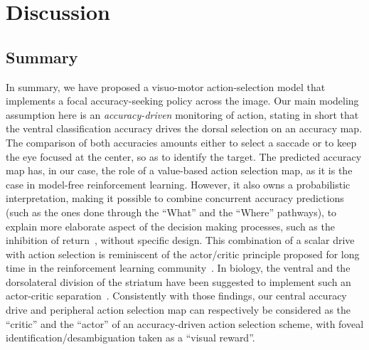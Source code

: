 \section{Discussion} \label{sec:discussion}
\subsection{Summary}

In summary, we have proposed a visuo-motor action-selection model that implements a focal accuracy-seeking policy across the image. Our main modeling assumption here is an \emph{accuracy-driven} monitoring of action, stating in short that the ventral classification accuracy drives the dorsal selection on an accuracy map. The comparison of both accuracies amounts either to select a saccade or to keep the eye focused at the center, so as to identify the target. The predicted accuracy map has, in our case, the role of a value-based action selection map, as it is the case in model-free reinforcement learning. However, it also owns a probabilistic interpretation, making it possible to combine concurrent accuracy predictions (such as the ones done through the ``What'' and the ``Where''  pathways), to explain more elaborate aspect of the decision making processes, such as the inhibition of return~\cite{Itti01}, without specific design. This combination of a scalar drive with action selection is reminiscent of the actor/critic principle proposed for long time in the reinforcement learning community~\cite{sutton1998reinforcement}. In biology, the ventral and the dorsolateral division of the striatum have been suggested to implement such an actor-critic separation~\cite{joel2002actor, takahashi2008silencing}. Consistently with those findings, our central accuracy drive and peripheral action selection map can respectively be considered as the ``critic'' and the ``actor'' of an accuracy-driven action selection scheme, with foveal identification/desambiguation taken as a ``visual reward''.


